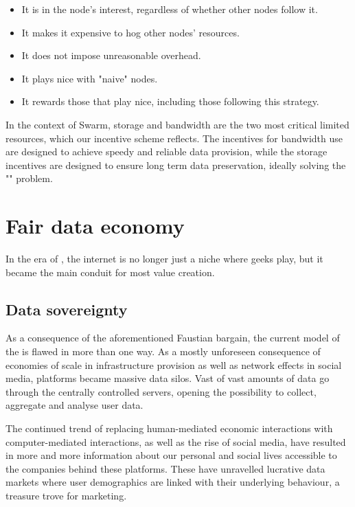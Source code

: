 \begin{itemize}
    \item It is in the node's interest, regardless of whether other nodes follow it.
    \item It makes it expensive to hog other nodes' resources.
    \item It does not impose unreasonable overhead.
    \item It plays nice with "naive" nodes.
    \item It rewards those that play nice, including those following this strategy.
\end{itemize}

In the context of Swarm, storage and bandwidth are the two most critical limited resources, which our incentive scheme reflects. The incentives for bandwidth use are designed to achieve speedy and reliable data provision, while the storage incentives are designed to ensure long term data preservation, ideally solving the "" problem.

\section{Fair data economy}\label{sec:fair-data}


In the era of , the internet is no longer just a niche where geeks play, but it became the main conduit for most value creation. 

\subsection{Data sovereignty}\label{sec:data-sovereignty}

As a consequence of the aforementioned Faustian bargain, the current model of the  is flawed in more than one way. As a mostly unforeseen consequence of economies of scale in infrastructure provision as well as network effects in social media, platforms became massive data silos. Vast of vast amounts of data go through the centrally controlled servers, opening the possibility to collect, aggregate and analyse user data. 

The continued trend of replacing human-mediated economic interactions with computer-mediated interactions, as well as the rise of social media, have resulted in more and more information about our personal and social lives accessible to the companies behind these platforms. These have unravelled lucrative data markets where user demographics are linked with their underlying behaviour, a treasure trove for marketing.


